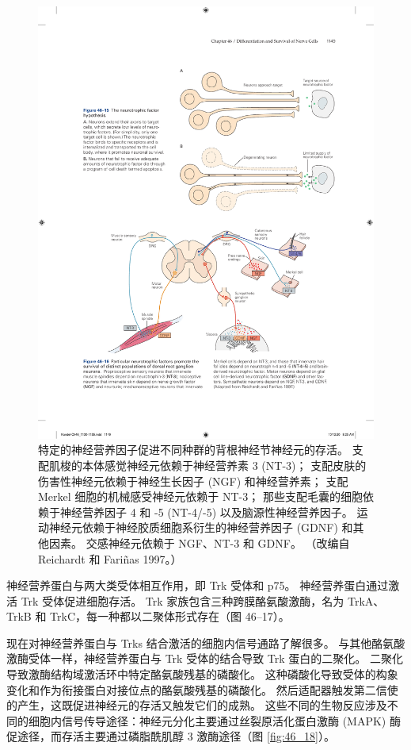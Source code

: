 \begin{figure}[htbp]
	\centering
	\includegraphics[width=0.8\linewidth]{chap46/fig_46_16}
	\caption{特定的神经营养因子促进不同种群的背根神经节神经元的存活。 支配肌梭的本体感觉神经元依赖于神经营养素 3 (NT-3)； 支配皮肤的伤害性神经元依赖于神经生长因子 (NGF) 和神经营养素； 支配 Merkel 细胞的机械感受神经元依赖于 NT-3； 那些支配毛囊的细胞依赖于神经营养因子 4 和 -5 (NT-4/-5) 以及脑源性神经营养因子。 运动神经元依赖于神经胶质细胞系衍生的神经营养因子 (GDNF) 和其他因素。 交感神经元依赖于 NGF、NT-3 和 GDNF。 （改编自 Reichardt 和 Fariñas 1997。）}
	\label{fig:46_16}
\end{figure}

神经营养蛋白与两大类受体相互作用，即 Trk 受体和 p75。 神经营养蛋白通过激活 Trk 受体促进细胞存活。 Trk 家族包含三种跨膜酪氨酸激酶，名为 TrkA、TrkB 和 TrkC，每一种都以二聚体形式存在（图 46–17）。

现在对神经营养蛋白与 Trks 结合激活的细胞内信号通路了解很多。 与其他酪氨酸激酶受体一样，神经营养蛋白与 Trk 受体的结合导致 Trk 蛋白的二聚化。 二聚化导致激酶结构域激活环中特定酪氨酸残基的磷酸化。 这种磷酸化导致受体的构象变化和作为衔接蛋白对接位点的酪氨酸残基的磷酸化。 然后适配器触发第二信使的产生，这既促进神经元的存活又触发它们的成熟。 
这些不同的生物反应涉及不同的细胞内信号传导途径：神经元分化主要通过丝裂原活化蛋白激酶 (MAPK) 酶促途径，而存活主要通过磷脂酰肌醇 3 激酶途径（图 \ref{fig:46_18}）。

